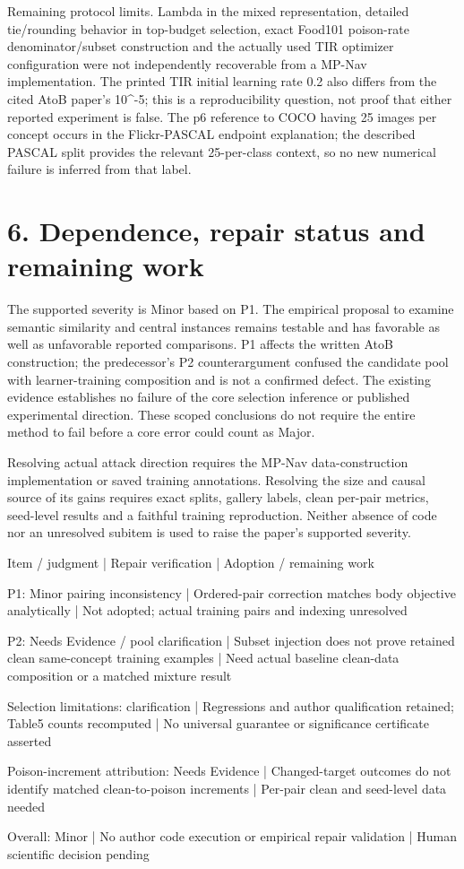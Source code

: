 \documentclass[10pt]{article}
\begin{document}
Remaining protocol limits. Lambda in the mixed representation, detailed tie/rounding behavior in top-budget selection, exact Food101 poison-rate denominator/subset construction and the actually used TIR optimizer configuration were not independently recoverable from a MP-Nav implementation. The printed TIR initial learning rate 0.2 also differs from the cited AtoB paper’s 10\textasciicircum{}-5; this is a reproducibility question, not proof that either reported experiment is false. The p6 reference to COCO having 25 images per concept occurs in the Flickr-PASCAL endpoint explanation; the described PASCAL split provides the relevant 25-per-class context, so no new numerical failure is inferred from that label.\par
\section*{6. Dependence, repair status and remaining work}
The supported severity is Minor based on P1. The empirical proposal to examine semantic similarity and central instances remains testable and has favorable as well as unfavorable reported comparisons. P1 affects the written AtoB construction; the predecessor’s P2 counterargument confused the candidate pool with learner-training composition and is not a confirmed defect. The existing evidence establishes no failure of the core selection inference or published experimental direction. These scoped conclusions do not require the entire method to fail before a core error could count as Major.\par
Resolving actual attack direction requires the MP-Nav data-construction implementation or saved training annotations. Resolving the size and causal source of its gains requires exact splits, gallery labels, clean per-pair metrics, seed-level results and a faithful training reproduction. Neither absence of code nor an unresolved subitem is used to raise the paper’s supported severity.\par
Item / judgment | Repair verification | Adoption / remaining work\par
P1: Minor pairing inconsistency | Ordered-pair correction matches body objective analytically | Not adopted; actual training pairs and indexing unresolved\par
P2: Needs Evidence / pool clarification | Subset injection does not prove retained clean same-concept training examples | Need actual baseline clean-data composition or a matched mixture result\par
Selection limitations: clarification | Regressions and author qualification retained; Table5 counts recomputed | No universal guarantee or significance certificate asserted\par
Poison-increment attribution: Needs Evidence | Changed-target outcomes do not identify matched clean-to-poison increments | Per-pair clean and seed-level data needed\par
Overall: Minor | No author code execution or empirical repair validation | Human scientific decision pending\par
\end{document}
